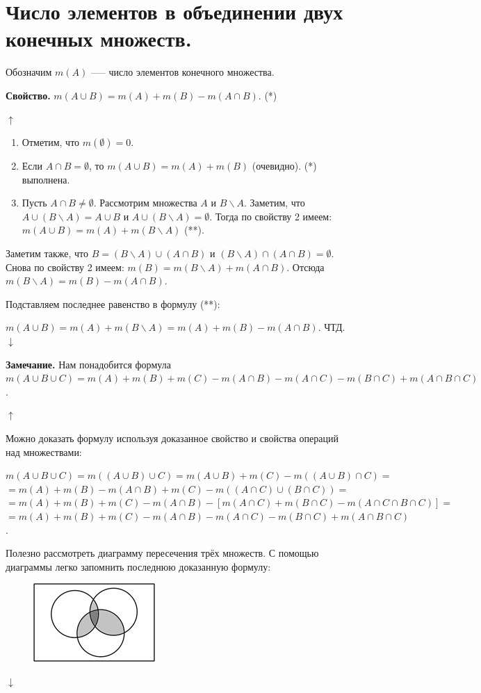 \documentclass{article}
\begin{document}
    \section{Число элементов в объединении двух конечных множеств.}

    Обозначим $m(A)$ --— число элементов конечного множества.

    \textbf{Свойство.} $m(A \cup B) = m(A) + m(B) - m(A \cap B)$. (*) 

    $\uparrow$

    \begin{enumerate}
        \item Отметим, что $m(\emptyset) = 0$.
        \item Если $A \cap B = \emptyset$, то $m(A \cup B) = m(A) + m(B)$ (очевидно). (*) выполнена. 
        \item Пусть $A \cap B \neq \emptyset$. Рассмотрим множества $A$ и $B \backslash A$. Заметим, что $A \cup (B \backslash A) = A \cup B$ и $A \cup (B \backslash A) = \emptyset$. Тогда по свойству 2 имеем: $m(A \cup B) = m(A) + m(B \backslash A)$ (**).  
    \end{enumerate}
    
    Заметим также, что $B = (B \backslash A) \cup (A \cap B)$ и $(B \backslash A) \cap (A \cap B) = \emptyset$. Снова по свойству 2 имеем: $m(B) = m(B \backslash A) + m(A \cap B)$. Отсюда $m(B \backslash A) = m(B) - m(A \cap B)$.

    Подставляем последнее равенство в формулу (**):

    $m(A \cup B) = m(A) + m(B \backslash A) = m(A) + m(B) - m(A \cap B)$. ЧТД. $\downarrow$

    \textbf{Замечание.} Нам понадобится формула $m(A \cup B \cup C) = m(A) + m(B) + m(C) - m(A \cap B) - m(A \cap C) - m(B \cap C) + m(A \cap B \cap C)$. 

    $\uparrow$
    
    Можно доказать формулу используя доказанное свойство и свойства операций над множествами:

    $m(A \cup B \cup C) = m((A \cup B) \cup C) = m(A \cup B) + m(C) - m((A \cup B) \cap C) =$\\
    $= m(A) + m(B) - m(A \cap B) + m(C) - m((A \cap C) \cup (B \cap C)) =$\\ 
    $= m(A) + m(B) + m(C) - m(A \cap B) - [m(A \cap C) + m(B \cap C) - m(A \cap C \cap B \cap C)] =$\\
    $= m(A) + m(B) + m(C) - m(A \cap B) - m(A \cap C) - m(B \cap C) + m(A \cap B \cap C)$.
    
    Полезно рассмотреть диаграмму пересечения трёх множеств. С помощью диаграммы легко запомнить последнюю доказанную формулу:

    \begin{figure}[h!]
    \centering
    \includegraphics{1_3}
    \end{figure}

    $\downarrow$
\end{document}
